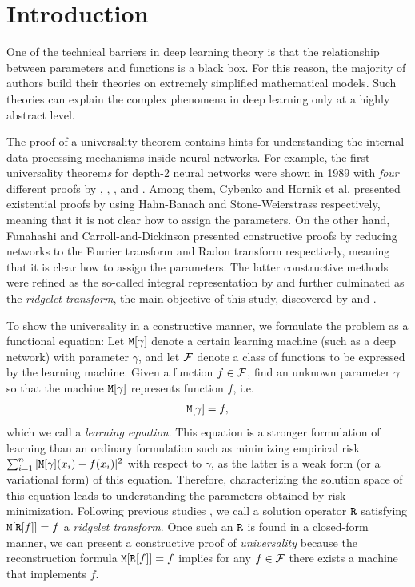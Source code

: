 \section{Introduction}
One of the technical barriers in deep learning theory is that the relationship between parameters and functions is a black box. For this reason, the majority of authors build their theories on extremely simplified mathematical models. Such theories can explain the complex phenomena in deep learning only at a highly abstract level.

The proof of a universality theorem contains hints for understanding the internal data processing mechanisms inside neural networks. For example, the first universality theorem\emph{s} for depth-2 neural networks were shown in 1989 with \emph{four} different proofs by \citet{Cybenko1989}, \citet{Hornik1989}, \citet{Funahashi1989}, and \citet{Carroll.Dickinson}. Among them, Cybenko and Hornik et al. presented existential proofs by using Hahn-Banach and Stone-Weierstrass respectively, meaning that it is not clear how to assign the parameters. On the other hand, Funahashi and Carroll-and-Dickinson presented constructive proofs by reducing networks to the Fourier transform and Radon transform respectively, meaning that it is clear how to assign the parameters. The latter constructive methods were refined as the so-called integral representation by \citet{Barron1993} and further culminated as the \emph{ridgelet transform}, the main objective of this study, discovered by \citet{Murata1996} and \citet{Candes.PhD}.

To show the universality in a constructive manner, we formulate the problem as a functional equation: 
Let $\mathtt{M}[\gamma]$ denote a certain learning machine (such as a deep network) with parameter $\gamma$, and let $\mathcal{F}$ denote a class of functions to be expressed by the learning machine. Given a function $f \in \mathcal{F}$, find an unknown parameter $\gamma$ so that the machine $\mathtt{M}[\gamma]$ represents function $f$, i.e.
\begin{align*}
	\mathtt{M}[\gamma] = f,
\end{align*}
which we call a \emph{learning equation}. 
This equation is a stronger formulation of learning than an ordinary formulation such as minimizing empirical risk $\sum_{i=1}^n|\mathtt{M}[\gamma](x_i) - f(x_i)|^2$ with respect to $\gamma$, as the latter is a weak form (or a variational form) of this equation. Therefore, characterizing the solution space of this equation leads to understanding the parameters obtained by risk minimization. Following previous studies \citep{Murata1996,Candes.PhD,Sonoda2021aistats,Sonoda2021ghost,Sonoda2022gconv,Sonoda2022symmetric}, we call a solution operator $\mathtt{R}$ satisfying $\mathtt{M}[\mathtt{R}[f]] = f$ a \emph{ridgelet transform}.
Once such an $\mathtt{R}$ is found in a closed-form manner, we can present a constructive proof of \emph{universality} because the reconstruction formula $\mathtt{M}[\mathtt{R}[f]]=f$ implies for any $f \in \mathcal{F}$ there exists a machine that implements $f$. 

